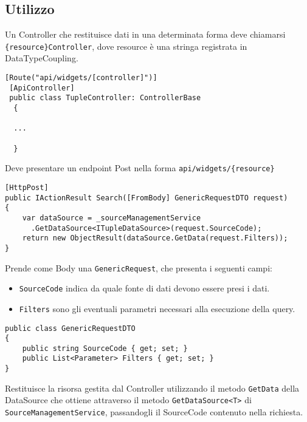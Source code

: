\subsection{Utilizzo}
Un Controller che restituisce dati in una determinata forma deve chiamarsi \verb|{resource}Controller|, dove resource è una stringa registrata in DataTypeCoupling.
\begin{lstlisting}[caption={TupleController.cs}, style=sharpCode]
 [Route("api/widgets/[controller]")]
 [ApiController]
 public class TupleController: ControllerBase
  {
  
  ...
  
  }
\end{lstlisting}
Deve presentare un endpoint Post nella forma \verb|api/widgets/{resource}|
\begin{lstlisting}[caption={TupleController.cs}, style=sharpCode]
[HttpPost]
public IActionResult Search([FromBody] GenericRequestDTO request)
{
    var dataSource = _sourceManagementService
      .GetDataSource<ITupleDataSource>(request.SourceCode);
    return new ObjectResult(dataSource.GetData(request.Filters));
}
\end{lstlisting}
Prende come Body una \verb|GenericRequest|, che presenta i seguenti campi:
\begin{itemize}
\item \verb|SourceCode| indica da quale fonte di dati devono essere presi i dati.
\item \verb|Filters| sono gli eventuali parametri necessari alla esecuzione della query.
\end{itemize}
\begin{lstlisting}[caption={GenericRequestDTO.cs}, style=sharpCode]
public class GenericRequestDTO
{
    public string SourceCode { get; set; }
    public List<Parameter> Filters { get; set; }
}
\end{lstlisting}
Restituisce la risorsa gestita dal Controller utilizzando il metodo \verb|GetData| della DataSource che ottiene attraverso il metodo \verb|GetDataSource<T>| di \verb|SourceManagementService|, passandogli il SourceCode contenuto nella richiesta.